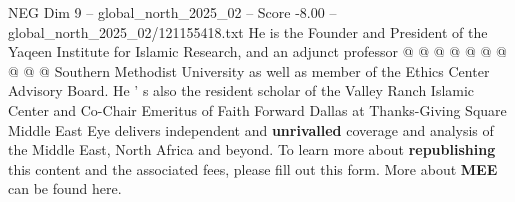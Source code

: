 \begin{textsample}{NEG Dim 9 – global\_north\_2025\_02 – Score -8.00 – global\_north\_2025\_02/121155418.txt}
He is the Founder and President of the Yaqeen Institute for Islamic Research, and an adjunct professor @ @ @ @ @ @ @ @ @ @ Southern Methodist University as well as member of the Ethics Center Advisory Board.
He ' s also the resident scholar of the Valley Ranch Islamic Center and Co-Chair Emeritus of Faith Forward Dallas at Thanks-Giving Square Middle East Eye delivers independent and \textbf{unrivalled} coverage and analysis of the Middle East, North Africa and beyond.
To learn more about \textbf{republishing} this content and the associated fees, please fill out this form.
More about \textbf{MEE} can be found here.

\end{textsample}
